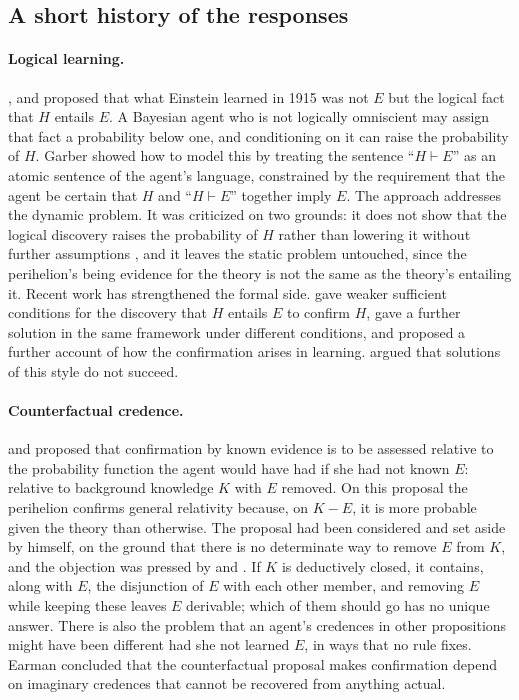 \documentclass{situationist-preprint}
\begin{document}
\subsection{A short history of the responses}\label{s:history}

\paragraph{Logical learning.} \citet{Garber1983}, \citet{Jeffrey1983} and \citet{Niiniluoto1983} proposed that what Einstein learned in 1915 was not $E$ but the logical fact that $H$ entails $E$. A Bayesian agent who is not logically omniscient may assign that fact a probability below one, and conditioning on it can raise the probability of $H$. Garber showed how to model this by treating the sentence \enquote{$H \vdash E$} as an atomic sentence of the agent's language, constrained by the requirement that the agent be certain that $H$ and \enquote{$H \vdash E$} together imply $E$. The approach addresses the dynamic problem. It was criticized on two grounds: it does not show that the logical discovery raises the probability of $H$ rather than lowering it without further assumptions \citep[ch.~5]{Earman1992}, and it leaves the static problem untouched, since the perihelion's being evidence for the theory is not the same as the theory's entailing it. Recent work has strengthened the formal side. \citet{HartmannFitelson2015} gave weaker sufficient conditions for the discovery that $H$ entails $E$ to confirm $H$, \citet{Sprenger2015} gave a further solution in the same framework under different conditions, and \citet{EvaHartmann2020} proposed a further account of how the confirmation arises in learning. \citet{Howson2017} argued that solutions of this style do not succeed.

\paragraph{Counterfactual credence.} \citet{Howson1991} and \citet{HowsonUrbach2006} proposed that confirmation by known evidence is to be assessed relative to the probability function the agent would have had if she had not known $E$: relative to background knowledge $K$ with $E$ removed. On this proposal the perihelion confirms general relativity because, on $K - E$, it is more probable given the theory than otherwise. The proposal had been considered and set aside by \citet{Glymour1980} himself, on the ground that there is no determinate way to remove $E$ from $K$, and the objection was pressed by \citet{Chihara1987} and \citet[ch.~5]{Earman1992}. If $K$ is deductively closed, it contains, along with $E$, the disjunction of $E$ with each other member, and removing $E$ while keeping these leaves $E$ derivable; which of them should go has no unique answer. There is also the problem that an agent's credences in other propositions might have been different had she not learned $E$, in ways that no rule fixes. Earman concluded that the counterfactual proposal makes confirmation depend on imaginary credences that cannot be recovered from anything actual.
\end{document}
